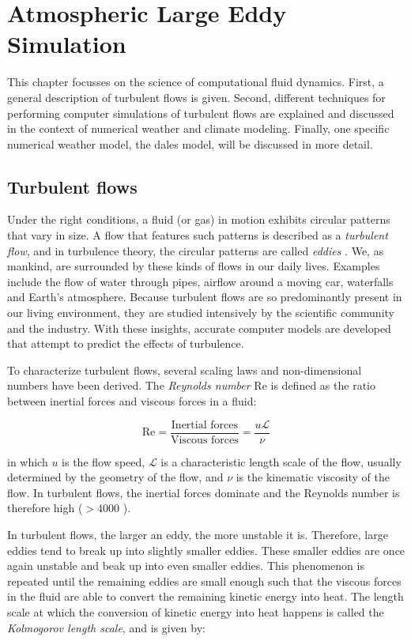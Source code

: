 \chapter{Atmospheric Large Eddy Simulation} \label{chap:les}
This chapter focusses on the science of computational fluid dynamics. First, a general description of turbulent flows is given. Second, different techniques for performing computer simulations of turbulent flows are explained and discussed in the context of numerical weather and climate modeling. Finally, one specific numerical weather model, the \acrfull{dales} model, will be discussed in more detail.

\section{Turbulent flows}
Under the right conditions, a fluid (or gas) in motion exhibits circular patterns that vary in size. A flow that features such patterns is described as a \emph{turbulent flow}, and in turbulence theory, the circular patterns are called \emph{eddies} \citep{popeTurbulentFlows2000}. We, as mankind, are surrounded by these kinds of flows in our daily lives. Examples include the flow of water through pipes, airflow around a moving car, waterfalls and Earth's atmosphere. Because turbulent flows are so predominantly present in our living environment, they are studied intensively by the scientific community and the industry. With these insights, accurate computer models are developed that attempt to predict the effects of turbulence.

To characterize turbulent flows, several scaling laws and non-dimensional numbers have been derived. The \emph{Reynolds number} $\text{Re}$ is defined as the ratio between inertial forces and viscous forces in a fluid: 

\begin{equation}
    \text{Re} = \frac{\text{Inertial forces}}{\text{Viscous forces}} = \frac{u \mathcal{L}}{\nu}
    \label{eq:reynolds_number}
\end{equation}

in which $u$ is the flow speed, $\mathcal{L}$ is a characteristic length scale of the flow, usually determined by the geometry of the flow, and $\nu$ is the kinematic viscosity of the flow. In turbulent flows, the inertial forces dominate and the Reynolds number is therefore high ($>4000$ \citep{popeTurbulentFlows2000}). 

In turbulent flows, the larger an eddy, the more unstable it is. Therefore, large eddies tend to break up into slightly smaller eddies. These smaller eddies are once again unstable and beak up into even smaller eddies. This phenomenon is repeated until the remaining eddies are small enough such that the viscous forces in the fluid are able to convert the remaining kinetic energy into heat. The length scale at which the conversion of kinetic energy into heat happens is called the \emph{Kolmogorov length scale}, and is given by:

